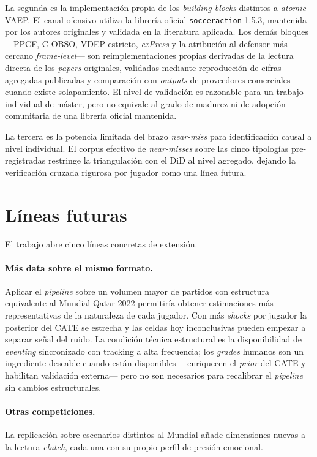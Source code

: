 La segunda es la implementación propia de los \textit{building blocks}
distintos a \textit{atomic}-VAEP. El canal ofensivo utiliza la
librería oficial \texttt{socceraction} 1.5.3, mantenida por los
autores originales y validada en la literatura aplicada. Los demás
bloques ---PPCF, C-OBSO, VDEP estricto, \textit{exPress} y la
atribución al defensor más cercano \textit{frame-level}--- son
reimplementaciones propias derivadas de la lectura directa de los
\textit{papers} originales, validadas mediante reproducción de cifras
agregadas publicadas y comparación con \textit{outputs} de proveedores
comerciales cuando existe solapamiento.
El nivel de validación es razonable para un trabajo individual de
máster, pero no equivale al grado de madurez ni de adopción
comunitaria de una librería oficial mantenida.

La tercera es la potencia limitada del brazo \textit{near-miss} para
identificación causal a nivel individual. El corpus efectivo de
\textit{near-misses} sobre las cinco tipologías pre-registradas
restringe la triangulación con el DiD al nivel agregado, dejando la
verificación cruzada rigurosa por jugador como una línea futura.


\section{Líneas futuras}
\label{sec:lineas-futuras}

El trabajo abre cinco líneas concretas de extensión.

\paragraph{Más data sobre el mismo formato.}
Aplicar el \textit{pipeline} sobre un volumen mayor de partidos con
estructura equivalente al Mundial Qatar 2022 permitiría obtener
estimaciones más representativas de la naturaleza de cada jugador.
Con más \textit{shocks} por jugador la posterior del CATE se estrecha
y las celdas hoy inconclusivas pueden empezar a separar señal del
ruido. La condición técnica estructural es la disponibilidad de
\textit{eventing} sincronizado con tracking a alta frecuencia; los
\textit{grades} humanos son un ingrediente deseable cuando están
disponibles ---enriquecen el \textit{prior} del CATE y habilitan
validación externa--- pero no son necesarios para recalibrar el
\textit{pipeline} sin cambios estructurales.

\paragraph{Otras competiciones.}
La replicación sobre escenarios distintos al Mundial añade dimensiones
nuevas a la lectura \textit{clutch}, cada una con su propio perfil
de presión emocional.

